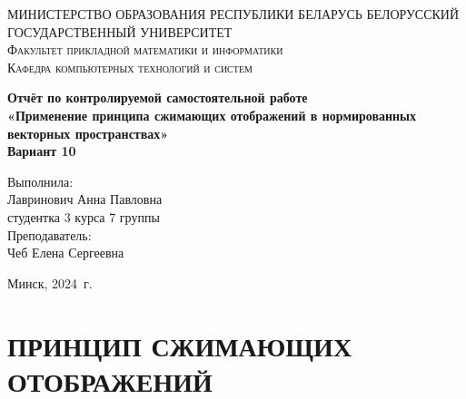 \documentclass[a4paper, 12pt]{report}
\begin{document}
\renewcommand{\chaptername}{Контрольная самостоятельная работа}
\def\contentsname{Содержание}
	
	\begin{titlepage}
		\begin{center}
			\textsc{МИНИСТЕРСТВО ОБРАЗОВАНИЯ РЕСПУБЛИКИ БЕЛАРУСЬ БЕЛОРУССКИЙ ГОСУДАРСТВЕННЫЙ УНИВЕРСИТЕТ
				\\[5mm]
				Факультет прикладной математики и информатики\\[2mm]
				Кафедра компьютерных технологий и систем
				}
			
			\vfill
			
			\textbf{Отчёт по контролируемой самостоятельной работе
				\\[3mm]
				«Применение принципа сжимающих отображений в нормированных векторных пространствах»\\[6mm]
				Вариант 10
				\\[20mm]
			}
		\end{center}
		
		\hfill
		\begin{minipage}{.4\textwidth}
			Выполнила:\\[2mm] 
			Лавринович Анна Павловна\\
			 студентка 3 курса 7 группы\\[5mm]
			
			Преподаватель:\\[2mm] 
			Чеб Елена Сергеевна
		\end{minipage}%
		\vfill
		\begin{center}
			Минск, 2024\ г.
		\end{center}
	\end{titlepage}
	
	\newpage
	\chapter*{ПРИНЦИП СЖИМАЮЩИХ ОТОБРАЖЕНИЙ}
\end{document}
